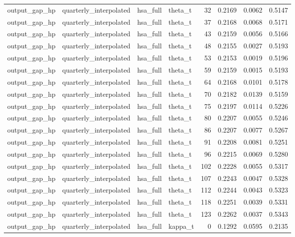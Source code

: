 \begin{tabular}{llllrrrr}
output\_gap\_hp & quarterly\_interpolated & hsa\_full & theta\_t & 32 & 0.2169 & 0.0062 & 0.5147 \\
output\_gap\_hp & quarterly\_interpolated & hsa\_full & theta\_t & 37 & 0.2168 & 0.0068 & 0.5171 \\
output\_gap\_hp & quarterly\_interpolated & hsa\_full & theta\_t & 43 & 0.2159 & 0.0056 & 0.5166 \\
output\_gap\_hp & quarterly\_interpolated & hsa\_full & theta\_t & 48 & 0.2155 & 0.0027 & 0.5193 \\
output\_gap\_hp & quarterly\_interpolated & hsa\_full & theta\_t & 53 & 0.2153 & 0.0019 & 0.5196 \\
output\_gap\_hp & quarterly\_interpolated & hsa\_full & theta\_t & 59 & 0.2159 & 0.0015 & 0.5193 \\
output\_gap\_hp & quarterly\_interpolated & hsa\_full & theta\_t & 64 & 0.2168 & 0.0101 & 0.5178 \\
output\_gap\_hp & quarterly\_interpolated & hsa\_full & theta\_t & 70 & 0.2182 & 0.0139 & 0.5159 \\
output\_gap\_hp & quarterly\_interpolated & hsa\_full & theta\_t & 75 & 0.2197 & 0.0114 & 0.5226 \\
output\_gap\_hp & quarterly\_interpolated & hsa\_full & theta\_t & 80 & 0.2207 & 0.0055 & 0.5246 \\
output\_gap\_hp & quarterly\_interpolated & hsa\_full & theta\_t & 86 & 0.2207 & 0.0077 & 0.5267 \\
output\_gap\_hp & quarterly\_interpolated & hsa\_full & theta\_t & 91 & 0.2208 & 0.0081 & 0.5251 \\
output\_gap\_hp & quarterly\_interpolated & hsa\_full & theta\_t & 96 & 0.2215 & 0.0069 & 0.5280 \\
output\_gap\_hp & quarterly\_interpolated & hsa\_full & theta\_t & 102 & 0.2228 & 0.0055 & 0.5317 \\
output\_gap\_hp & quarterly\_interpolated & hsa\_full & theta\_t & 107 & 0.2243 & 0.0047 & 0.5328 \\
output\_gap\_hp & quarterly\_interpolated & hsa\_full & theta\_t & 112 & 0.2244 & 0.0043 & 0.5323 \\
output\_gap\_hp & quarterly\_interpolated & hsa\_full & theta\_t & 118 & 0.2251 & 0.0039 & 0.5331 \\
output\_gap\_hp & quarterly\_interpolated & hsa\_full & theta\_t & 123 & 0.2262 & 0.0037 & 0.5343 \\
output\_gap\_hp & quarterly\_interpolated & hsa\_full & kappa\_t & 0 & 0.1292 & 0.0595 & 0.2135 \\

\end{tabular}
